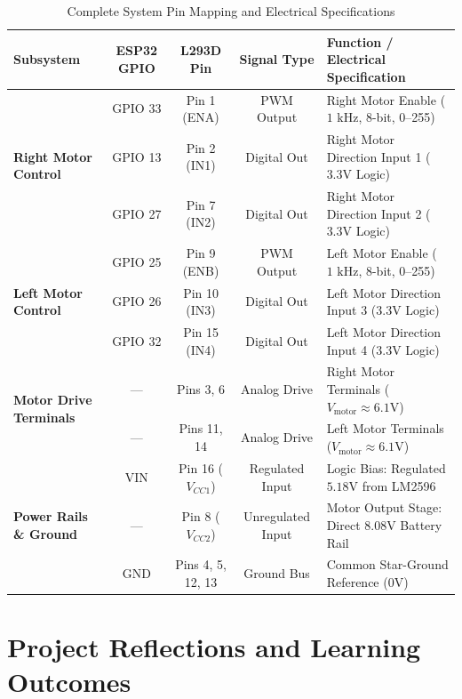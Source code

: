 \documentclass[journal,12pt,onecolumn]{IEEEtran}
\begin{document}
\begin{table}[H]
	\centering
	\small
	\caption{Complete System Pin Mapping and Electrical Specifications}
	\label{tab:ugv_pin_mapping}
	\begin{tabularx}{\linewidth}{|l|c|c|c|X|}
		\hline
		\textbf{Subsystem} & \textbf{ESP32 GPIO} & \textbf{L293D Pin} & \textbf{Signal Type} & \textbf{Function / Electrical Specification} \\ \hline
		\multirow{3}{*}{\textbf{Right Motor Control}} 
		& GPIO 33 & Pin 1 (ENA) & PWM Output & Right Motor Enable ($1\text{ kHz}$, 8-bit, 0--255) \\ \cline{2-5}
		& GPIO 13 & Pin 2 (IN1) & Digital Out & Right Motor Direction Input 1 ($3.3\text{V}$ Logic) \\ \cline{2-5}
		& GPIO 27 & Pin 7 (IN2) & Digital Out & Right Motor Direction Input 2 ($3.3\text{V}$ Logic) \\ \hline
		\multirow{3}{*}{\textbf{Left Motor Control}} 
		& GPIO 25 & Pin 9 (ENB) & PWM Output & Left Motor Enable ($1\text{ kHz}$, 8-bit, 0--255) \\ \cline{2-5}
		& GPIO 26 & Pin 10 (IN3) & Digital Out & Left Motor Direction Input 3 ($3.3\text{V}$ Logic) \\ \cline{2-5}
		& GPIO 32 & Pin 15 (IN4) & Digital Out & Left Motor Direction Input 4 ($3.3\text{V}$ Logic) \\ \hline
		\multirow{2}{*}{\textbf{Motor Drive Terminals}} 
		& --- & Pins 3, 6 & Analog Drive & Right Motor Terminals ($V_{\text{motor}} \approx 6.1\text{V}$) \\ \cline{2-5}
		& --- & Pins 11, 14 & Analog Drive & Left Motor Terminals ($V_{\text{motor}} \approx 6.1\text{V}$) \\ \hline
		\multirow{3}{*}{\textbf{Power Rails \& Ground}} 
		& VIN & Pin 16 ($V_{CC1}$) & Regulated Input & Logic Bias: Regulated $5.18\text{V}$ from LM2596 \\ \cline{2-5}
		& --- & Pin 8 ($V_{CC2}$) & Unregulated Input & Motor Output Stage: Direct $8.08\text{V}$ Battery Rail \\ \cline{2-5}
		& GND & Pins 4, 5, 12, 13 & Ground Bus & Common Star-Ground Reference ($0\text{V}$) \\ \hline
	\end{tabularx}
\end{table}

\newpage

\section{Project Reflections and Learning Outcomes}
\end{document}

